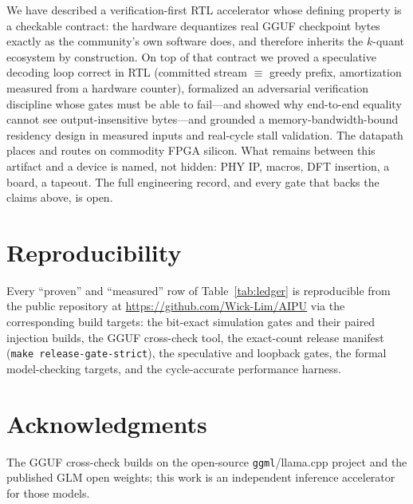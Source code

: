\documentclass[11pt]{article}
\newcommand{\code}[1]{\texttt{#1}}
\begin{document}
We have described a verification-first RTL accelerator whose defining property
is a checkable contract: the hardware dequantizes real GGUF checkpoint bytes
exactly as the community's own software does, and therefore inherits the
$k$-quant ecosystem by construction. On top of that contract we proved a
speculative decoding loop correct in RTL (committed stream $\equiv$ greedy
prefix, amortization measured from a hardware counter), formalized an
adversarial verification discipline whose gates must be able to fail---and
showed why end-to-end equality cannot see output-insensitive bytes---and
grounded a memory-bandwidth-bound residency design in measured inputs and
real-cycle stall validation. The datapath places and routes on commodity FPGA
silicon. What remains between this artifact and a device is named, not hidden:
PHY IP, macros, DFT insertion, a board, a tapeout. The full engineering record,
and every gate that backs the claims above, is open.

\section*{Reproducibility}
Every ``proven'' and ``measured'' row of Table~\ref{tab:ledger} is reproducible
from the public repository at \url{https://github.com/Wick-Lim/AIPU} via the
corresponding build targets: the bit-exact simulation gates and their paired
injection builds, the GGUF cross-check tool, the exact-count release manifest
(\code{make release-gate-strict}), the speculative and loopback gates, the
formal model-checking targets, and the cycle-accurate performance harness.

\section*{Acknowledgments}
The GGUF cross-check builds on the open-source \code{ggml}/llama.cpp project
and the published GLM open weights; this work is an independent inference
accelerator for those models.
\end{document}
